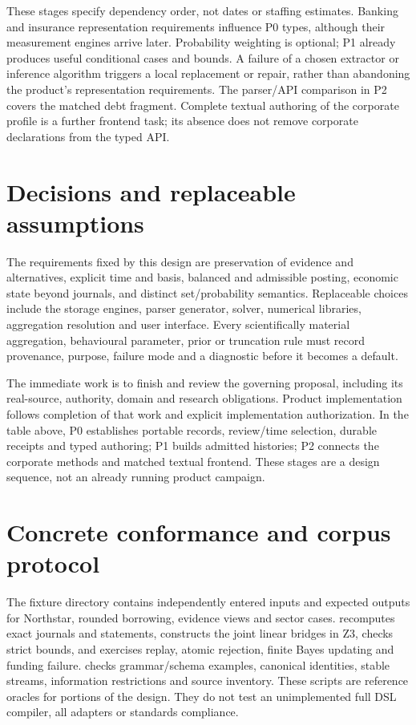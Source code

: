 These stages specify dependency order, not dates or staffing estimates.
Banking and insurance representation requirements influence P0 types, although
their measurement engines arrive later. Probability weighting is optional;
P1 already produces useful conditional cases and bounds. A failure of a chosen
extractor or inference algorithm triggers a local replacement or repair,
rather than abandoning the product's representation requirements.
The parser/API comparison in P2 covers the matched debt fragment. Complete
textual authoring of the corporate profile is a further frontend task;
its absence does not remove corporate declarations from the typed API.

\section{Decisions and replaceable assumptions}

The requirements fixed by this design are preservation of evidence and
alternatives, explicit time and basis, balanced and admissible posting, economic
state beyond journals, and distinct set/probability semantics. Replaceable
choices include the storage engines, parser generator, solver, numerical
libraries, aggregation resolution and user interface. Every scientifically
material aggregation, behavioural parameter, prior or truncation rule must
record provenance, purpose, failure mode and a diagnostic before it becomes a
default.

The immediate work is to finish and review the governing proposal, including
its real-source, authority, domain and research obligations. Product
implementation follows completion of that work and explicit implementation
authorization. In the table above, P0 establishes portable records, review/time
selection, durable receipts and typed authoring; P1 builds admitted histories;
P2 connects the corporate methods and matched textual frontend. These stages
are a design sequence, not an already running product campaign.

\section{Concrete conformance and corpus protocol}

The fixture directory contains independently entered inputs and expected
outputs for Northstar, rounded borrowing, evidence views and sector cases.
 recomputes exact journals and statements,
constructs the joint linear bridges in Z3, checks strict bounds, and exercises
replay, atomic rejection, finite Bayes updating and funding failure.
 checks grammar/schema examples, canonical
identities, stable streams, information restrictions and source inventory.
These scripts are reference oracles for portions of the design. They do not
test an unimplemented full DSL compiler, all adapters or standards compliance.

